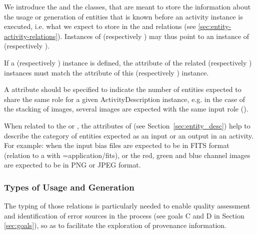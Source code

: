 We introduce the  and the  classes, that are meant to store the information about the usage or generation of entities that is known before an activity instance is executed, i.e. what we expect to store in the  and  relations (see \ref{sec:entity-activity-relations}). 
Instances of  (respectively ) may thus point to an instance of  (respectively ).


If a  (respectively ) instance is defined, the  attribute of the related  (respectively ) instances must match the  attribute of this  (respectively ) instance.

A  attribute should be specified to indicate the number of entities expected to share the same role for a given ActivityDescription instance, e.g. in the case of the stacking of images, several images are expected with the same input role ().

When related to the  or , the attributes of  (see Section~\ref{sec:entity_desc}) help to describe the category of entities expected as an input or an output in an activity. For example: when the input bias files are expected to be in FITS format (relation to a  with =application/fits), or the red, green and blue channel images are expected to be in PNG or JPEG format. 


\subsubsection{Types of Usage and Generation}
\label{sec:ugtypes}

The typing of those relations is particularly needed to enable quality assessment and identification of error sources in the process (see goals C and D in Section \ref{sec:goals}), so as to facilitate the exploration of provenance information. 

